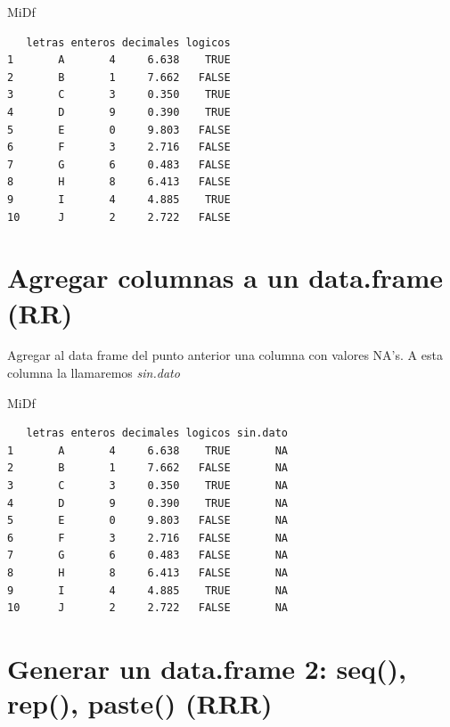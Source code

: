 \documentclass[]{book}
\newenvironment{Shaded}{\begin{snugshade}}{\end{snugshade}}
\newcommand{\NormalTok}[1]{#1}
\begin{document}
\begin{Shaded}
\begin{Highlighting}[]
\NormalTok{MiDf}
\end{Highlighting}
\end{Shaded}

\begin{verbatim}
   letras enteros decimales logicos
1       A       4     6.638    TRUE
2       B       1     7.662   FALSE
3       C       3     0.350    TRUE
4       D       9     0.390    TRUE
5       E       0     9.803   FALSE
6       F       3     2.716   FALSE
7       G       6     0.483   FALSE
8       H       8     6.413   FALSE
9       I       4     4.885    TRUE
10      J       2     2.722   FALSE
\end{verbatim}

\hypertarget{agregar-columnas-a-un-data.frame-rr}{%
\section{Agregar columnas a un data.frame (RR)}\label{agregar-columnas-a-un-data.frame-rr}}

Agregar al data frame del punto anterior una columna con valores NA's. A esta columna la llamaremos \emph{sin.dato}

\begin{Shaded}
\begin{Highlighting}[]
\NormalTok{MiDf}
\end{Highlighting}
\end{Shaded}

\begin{verbatim}
   letras enteros decimales logicos sin.dato
1       A       4     6.638    TRUE       NA
2       B       1     7.662   FALSE       NA
3       C       3     0.350    TRUE       NA
4       D       9     0.390    TRUE       NA
5       E       0     9.803   FALSE       NA
6       F       3     2.716   FALSE       NA
7       G       6     0.483   FALSE       NA
8       H       8     6.413   FALSE       NA
9       I       4     4.885    TRUE       NA
10      J       2     2.722   FALSE       NA
\end{verbatim}

\hypertarget{generar-un-data.frame-2-seq-rep-paste-rrr}{%
\section{Generar un data.frame 2: seq(), rep(), paste() (RRR)}\label{generar-un-data.frame-2-seq-rep-paste-rrr}}
\end{document}
